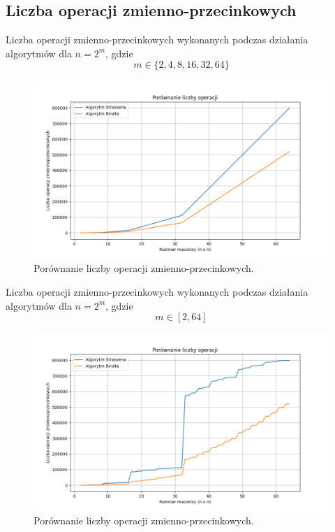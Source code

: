 \documentclass[11pt, leqno]{scrartcl}
\begin{document}
    \subsection{Liczba operacji zmienno-przecinkowych}
    Liczba operacji zmienno-przecinkowych wykonanych podczas
    działania algorytmów dla $n=2^m$, gdzie
    \[
        m \in \{2,4,8,16,32,64\}
    \]
    \begin{figure}[H]
        \centering
        \includegraphics[width=0.9\linewidth]{liczba_operacji1.png}
        \caption{Porównanie liczby operacji zmienno-przecinkowych.}
    \end{figure}
    Liczba operacji zmienno-przecinkowych wykonanych podczas
    działania algorytmów dla $n=2^m$, gdzie
    \[
        m \in [2, 64]
    \]
    \begin{figure}[H]
        \centering
        \includegraphics[width=0.9\linewidth]{liczba_operacji2.png}
        \caption{Porównanie liczby operacji zmienno-przecinkowych.}
    \end{figure}
\end{document}
